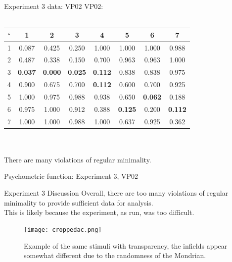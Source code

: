 \documentclass{beamer}
\begin{document}
\begin{frame}[t]{Experiment 3 data: VP02}
VP02:\\
~\\
\begin{tabular}{c | c c c c c c c}
` & 1 & 2 & 3 & 4 & 5 & 6 & 7 \\ \hline

1 & {\color{red} 0.087} & 0.425 & 0.250 & 1.000 & 1.000 & 1.000 & 0.988\\

2 & 0.487 & 0.338 & {\color{red} 0.150} & 0.700 & 0.963 & 0.963 & 1.000\\

3 & {\bf 0.037} & {\bf \color{red} 0.000} & {\bf 0.025} & {\bf 0.112} & 0.838 & 0.838 & 0.975\\

4 & 0.900 & 0.675 & 0.700 & {\bf \color{red} 0.112} & 0.600 & 0.700 & 0.925\\

5 & 1.000 & 0.975 & 0.988 & 0.938 & 0.650 & {\bf \color{red} 0.062} & 0.188\\

6 & 0.975 & 1.000 & 0.912 & 0.388 & {\bf 0.125} & 0.200 & {\bf \color{red} 0.112}\\

7 & 1.000 & 1.000 & 0.988 & 1.000 & 0.637 & 0.925 & {\color{red} 0.362}\\

\end{tabular}
\\
~\\
There are many violations of regular minimality.

\end{frame}

\begin{frame}[t]{Psychometric function: Experiment 3, VP02}
\end{frame}




\begin{frame}[t]{Experiment 3 Discussion}
Overall, there are too many violations of regular minimality to provide sufficient data for analysis.\\

This is likely because the experiment, as run, was too difficult.

\begin{figure}[c]
\texttt{[image: croppedac.png]}
\caption{Example of the same stimuli with transparency, the infields appear somewhat different due to the randomness of the Mondrian.}
\end{figure}

\end{frame}
\end{document}
